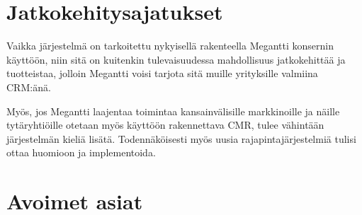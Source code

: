 \section{Jatkokehitysajatukset}     %

    Vaikka järjestelmä on tarkoitettu nykyisellä rakenteella Megantti konsernin käyttöön, niin sitä on kuitenkin tulevaisuudessa
    mahdollisuus jatkokehittää ja tuotteistaa, jolloin Megantti voisi tarjota sitä muille yrityksille valmiina CRM:änä.

    Myös, jos Megantti laajentaa toimintaa kansainvälisille markkinoille ja näille tytäryhtiöille otetaan myös käyttöön rakennettava
    CMR, tulee vähintään järjestelmän kieliä lisätä. Todennäköisesti myös uusia rajapintajärjestelmiä tulisi ottaa huomioon ja implementoida.

\section{Avoimet asiat}     %



   
